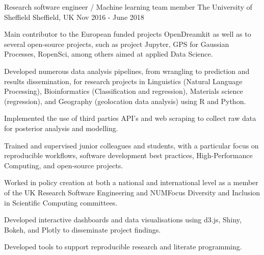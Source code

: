 \begin{cventries}
\cventry
{Research software engineer  / Machine learning team member } %
{The University of Sheffield } %
{Sheffield, UK} %
{Nov 2016 - June 2018 } %
{ %
\begin{cvitems}
\item {Main contributor to the European funded projects OpenDreamkit as well as to several open-source projects, such as project Jupyter, GPS for Gaussian Processes, RopenSci, among others aimed at applied Data Science.}
\item {Developed numerous data analysis pipelines, from wrangling to prediction and results dissemination, for research projects in Linguistics (Natural Language Processing), Bioinformatics (Classification and regression), Materials science (regression), and Geography (geolocation data analysis) using R and Python.}
\item { Implemented the use of third parties API's and web scraping to collect raw data for posterior analysis and modelling.}
\item {Trained and supervised junior colleagues and students, with a particular focus on reproducible workflows, software development best practices, High-Performance Computing, and open-source projects.}
\item {Worked in policy creation at both a national and international level as a member of the UK Research Software Engineering and NUMFocus Diversity and Inclusion in Scientific Computing committees.}
\item {Developed interactive dashboards and data visualisations using d3.js, Shiny, Bokeh, and Plotly to disseminate project findings.}
\item{Developed tools to support reproducible research and literate programming.}
\end{cvitems}
}






\end{cventries}
